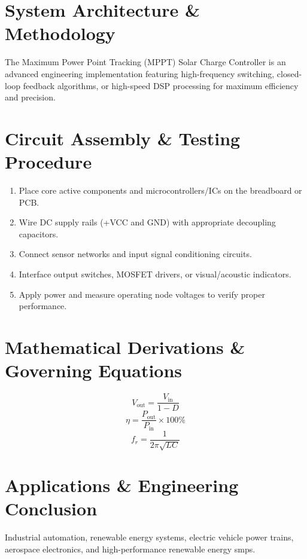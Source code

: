 \documentclass[11pt,a4paper]{article}
\begin{document}
\section{System Architecture \& Methodology}
The Maximum Power Point Tracking (MPPT) Solar Charge Controller is an advanced engineering implementation featuring high-frequency switching, closed-loop feedback algorithms, or high-speed DSP processing for maximum efficiency and precision.

\section{Circuit Assembly \& Testing Procedure}
\begin{enumerate}
    \item Place core active components and microcontrollers/ICs on the breadboard or PCB.
    \item Wire DC supply rails (+VCC and GND) with appropriate decoupling capacitors.
    \item Connect sensor networks and input signal conditioning circuits.
    \item Interface output switches, MOSFET drivers, or visual/acoustic indicators.
    \item Apply power and measure operating node voltages to verify proper performance.
\end{enumerate}

\section{Mathematical Derivations \& Governing Equations}
\begin{equation}
V_{\text{out}} = \frac{V_{\text{in}}}{1 - D}
\end{equation}
\begin{equation}
\eta = \frac{P_{\text{out}}}{P_{\text{in}}} \times 100\%
\end{equation}
\begin{equation}
f_r = \frac{1}{2\pi \sqrt{L C}}
\end{equation}

\section{Applications \& Engineering Conclusion}
Industrial automation, renewable energy systems, electric vehicle power trains, aerospace electronics, and high-performance renewable energy smps.
\end{document}
